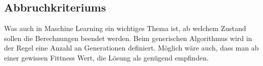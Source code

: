 %
%
%
%
\subsection{Abbruchkriteriums
\label{genetic_algorithm:termination}}
Was auch in Maschine Learning ein wichtiges Thema ist, ab welchem 
Zustand sollen die Berechnungen beendet werden. Beim generischen 
Algorithmus wird in der Regel eine Anzahl an Generationen definiert.
Möglich wäre auch, dass man ab einer gewissen Fittness Wert, die Lösung 
als genügend empfinden.


